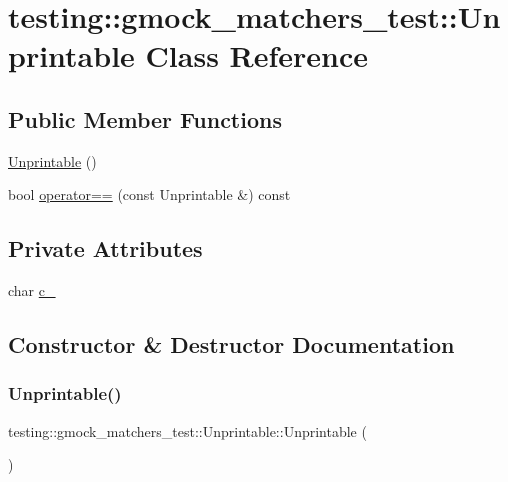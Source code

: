 \hypertarget{classtesting_1_1gmock__matchers__test_1_1_unprintable}{}\section{testing\+::gmock\+\_\+matchers\+\_\+test\+::Unprintable Class Reference}
\label{classtesting_1_1gmock__matchers__test_1_1_unprintable}
\subsection*{Public Member Functions}
\begin{DoxyCompactItemize}
\item 
\mbox{\hyperlink{classtesting_1_1gmock__matchers__test_1_1_unprintable_a70bca9e23271621ada7f52a4d190677a}{Unprintable}} ()
\item 
bool \mbox{\hyperlink{classtesting_1_1gmock__matchers__test_1_1_unprintable_ae09dc235a5341b07f0299bd24ee37e2d}{operator==}} (const Unprintable \&) const
\end{DoxyCompactItemize}
\subsection*{Private Attributes}
\begin{DoxyCompactItemize}
\item 
char \mbox{\hyperlink{classtesting_1_1gmock__matchers__test_1_1_unprintable_a4fb141b6b97e7bc6e046f94fce6dc1a8}{c\+\_\+}}
\end{DoxyCompactItemize}


\subsection{Constructor \& Destructor Documentation}
\mbox{\label{classtesting_1_1gmock__matchers__test_1_1_unprintable_a70bca9e23271621ada7f52a4d190677a}} 
\subsubsection{\texorpdfstring{Unprintable()}{Unprintable()}}
{\footnotesize\ttfamily testing\+::gmock\+\_\+matchers\+\_\+test\+::\+Unprintable\+::\+Unprintable (\begin{DoxyParamCaption}{ }\end{DoxyParamCaption})\hspace{0.3cm}{\ttfamily [inline]}}



